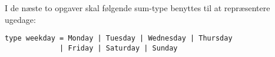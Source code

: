 I de næste to opgaver skal følgende sum-type benyttes til at
repræsentere ugedage:

\begin{lstlisting}[numbers=none,frame=none,mathescape]
type weekday = Monday | Tuesday | Wednesday | Thursday
             | Friday | Saturday | Sunday
\end{lstlisting}
